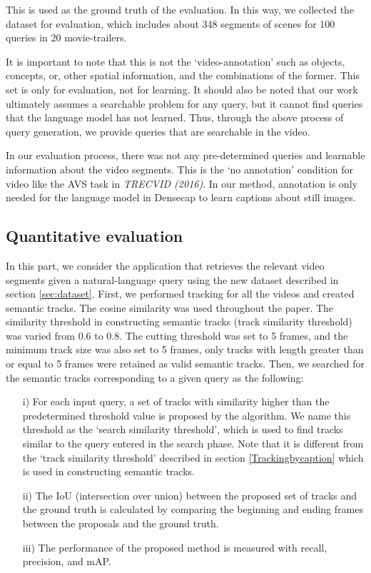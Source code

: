 This is used as the ground truth of the evaluation.
In this way, we collected the dataset for evaluation, which includes about 348 segments of scenes for 100 queries in 20 movie-trailers. 

It is important to note that this is not the `video-annotation' such as objects, concepts, or, other spatial information, and the combinations of the former. This set is only for evaluation, not for learning. 
It should also be noted that our work ultimately assumes a searchable problem for any query, but it cannot find queries that the language model has not learned. Thus, through the above  process of query generation, we provide queries that are searchable in the video.

In our evaluation process, there was not any pre-determined queries and learnable information about the video segments. This is the `no annotation' condition for video like the AVS task in {\itshape TRECVID (2016)}.
In our method, annotation is only needed for the language model in Densecap to learn captions about still images.


\subsection{Quantitative evaluation}

In this part, we consider the application that retrieves the relevant video segments given a natural-language query using the new dataset described in section \ref{sec:dataset}. First, we performed tracking for all the videos and created semantic tracks. The cosine similarity was used throughout the paper. The similarity threshold in constructing semantic tracks (track similarity threshold) was varied from 0.6 to 0.8. The cutting threshold was set to 5 frames, and the minimum track size was also set to 5 frames, \ie only tracks with length greater than or equal to 5 frames were retained as valid semantic tracks. Then, we searched for the semantic tracks corresponding to a given query as the following:

\begin{enumerate}[wide, labelwidth=!, labelindent=0pt]

\item[i)] For each input query, a set of tracks with similarity higher than the predetermined threshold value is proposed by the algorithm. We name this threshold as the `search similarity threshold', which is used to find tracks similar to the query entered in the search phase. Note that it is different from the `track similarity threshold' described in section \ref{Trackingbycaption} which is used in constructing semantic tracks.

\item[ii)] The IoU (intersection over union) between the proposed set of tracks and the ground truth is calculated by comparing the beginning and ending frames between the proposals and the ground truth.

\item[iii)] The performance of the proposed method is measured with recall, precision, and mAP.%

\end{enumerate}

